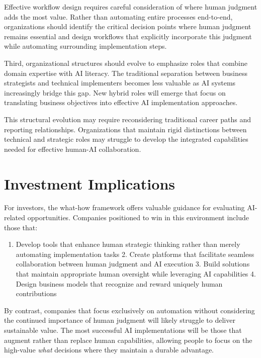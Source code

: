 \documentclass[
  Letterpaper,
]{scrbook}
\providecommand{\tightlist}{%
  \setlength{\itemsep}{0pt}\setlength{\parskip}{0pt}}\usepackage{longtable,booktabs,array}
\begin{document}
Effective workflow design requires careful consideration of where human
judgment adds the most value. Rather than automating entire processes
end-to-end, organizations should identify the critical decision points
where human judgment remains essential and design workflows that
explicitly incorporate this judgment while automating surrounding
implementation steps.

Third, organizational structures should evolve to emphasize roles that
combine domain expertise with AI literacy. The traditional separation
between business strategists and technical implementers becomes less
valuable as AI systems increasingly bridge this gap. New hybrid roles
will emerge that focus on translating business objectives into effective
AI implementation approaches.

This structural evolution may require reconsidering traditional career
paths and reporting relationships. Organizations that maintain rigid
distinctions between technical and strategic roles may struggle to
develop the integrated capabilities needed for effective human-AI
collaboration.

\section{Investment Implications}\label{investment-implications-1}

For investors, the what-how framework offers valuable guidance for
evaluating AI-related opportunities. Companies positioned to win in this
environment include those that:

\begin{enumerate}
\def\labelenumi{\arabic{enumi}.}
\tightlist
\item
  Develop tools that enhance human strategic thinking rather than merely
  automating implementation tasks 2. Create platforms that facilitate
  seamless collaboration between human judgment and AI execution 3.
  Build solutions that maintain appropriate human oversight while
  leveraging AI capabilities 4. Design business models that recognize
  and reward uniquely human contributions
\end{enumerate}

By contrast, companies that focus exclusively on automation without
considering the continued importance of human judgment will likely
struggle to deliver sustainable value. The most successful AI
implementations will be those that augment rather than replace human
capabilities, allowing people to focus on the high-value \emph{what}
decisions where they maintain a durable advantage.
\end{document}

